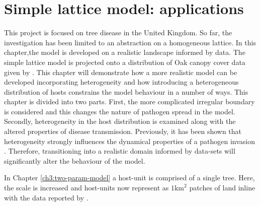 
\chapter{Simple lattice model: applications}
\label{chapter:SLM-applications}

This project is focused on tree disease in the United Kingdom. %
So far, the investigation has been limited to an abstraction on a homogeneous lattice. %
In this chapter,the  model is developed on  a realistic landscape informed by data. %
The simple lattice model is projected onto a distribution of Oak canopy cover data given %
by \cite{hill.data}. %
This chapter  will  demonstrate how a more realistic model can be developed %
incorporating heterogeneity and how %
introducing a heterogeneous distribution of hosts constrains the model behaviour %
in a number of ways. %
This chapter is divided into two parts. %
First, the more complicated irregular boundary is considered and this changes the nature of pathogen%
 spread in the model. %
Secondly,  heterogeneity in the host distribution is examined along with the altered properties %
of disease transmission. %
Previously, it has been shown that heterogeneity strongly influences the  dynamical properties %
of a pathogen invasion \cite{madden1995plant}. %
Therefore, transitioning into a realistic domain informed by data-sets will significantly %
alter the  behaviour of the model.  %

In Chapter \ref{ch3:two-param-model} a host-unit is comprised of a single tree. %
Here, the scale is increased and host-units now represent as  $1\mathrm{km}^2$ patches of land \textemdash inline with the data reported by \cite{hill.data}. %


